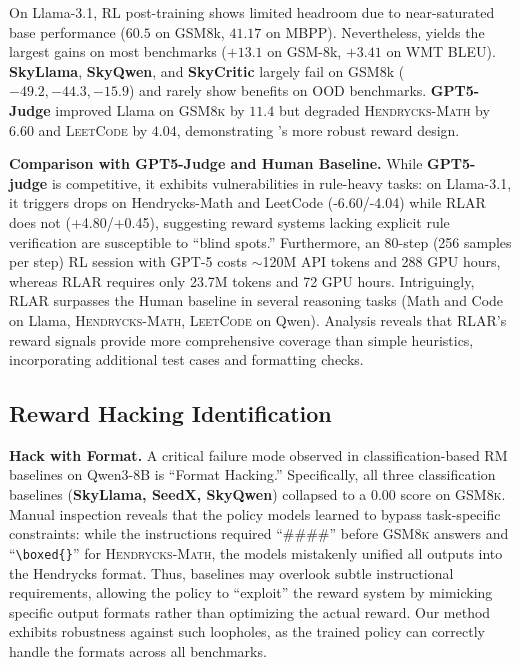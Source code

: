 On Llama-3.1, RL post-training shows limited headroom due to near-saturated base performance ($60.5$ on GSM8k, $41.17$ on MBPP). Nevertheless, \method{} yields the largest gains on most benchmarks ($+13.1$ on GSM-8k, $+3.41$ on \textsc{WMT} BLEU). \textbf{SkyLlama}, \textbf{SkyQwen}, and \textbf{SkyCritic} largely fail on GSM8k (\(-49.2, -44.3, -15.9\)) and rarely show benefits on OOD benchmarks.
\textbf{GPT5-Judge} improved Llama on \textsc{GSM8k} by \(11.4\) but degraded \textsc{Hendrycks-Math} by \(6.60\) and \textsc{LeetCode} by \(4.04\), demonstrating \method{}'s more robust reward design.



\noindent\textbf{Comparison with GPT5-Judge and Human Baseline.} \quad
While \textbf{GPT5-judge} is competitive, it exhibits vulnerabilities in rule-heavy tasks: on Llama-3.1, it triggers drops on Hendrycks-Math and LeetCode (-6.60/-4.04) while RLAR does not (+4.80/+0.45), suggesting reward systems lacking explicit rule verification are susceptible to ``blind spots.'' Furthermore, an 80-step (256 samples per step) RL session with GPT-5 costs ${\sim}$120M API tokens and 288 GPU hours, whereas RLAR requires only 23.7M tokens and 72 GPU hours.
Intriguingly, RLAR surpasses the Human baseline in several reasoning tasks (Math and Code on Llama, \textsc{Hendrycks-Math, LeetCode} on Qwen). Analysis reveals that RLAR's reward signals provide more comprehensive coverage than simple heuristics, incorporating additional test cases and formatting checks.


\subsection{Reward Hacking Identification}

\noindent \textbf{Hack with Format.} \quad
A critical failure mode observed in classification-based RM baselines on Qwen3-8B is ``Format Hacking.'' Specifically, all three classification baselines (\textbf{SkyLlama, SeedX, SkyQwen}) collapsed to a \(0.00\) score on \textsc{GSM8k}. Manual inspection reveals that the policy models learned to bypass task-specific constraints: while the instructions required ``\#\#\#\#'' before \textsc{GSM8k} answers and ``\texttt{\textbackslash{}boxed\{\}}'' for \textsc{Hendrycks-Math}, the models mistakenly unified all outputs into the Hendrycks format. 
Thus, baselines may overlook subtle instructional requirements, allowing the policy to ``exploit'' the reward system by mimicking specific output formats rather than optimizing the actual reward.
Our method exhibits robustness against such loopholes, as the trained policy can correctly handle the formats across all benchmarks. 



